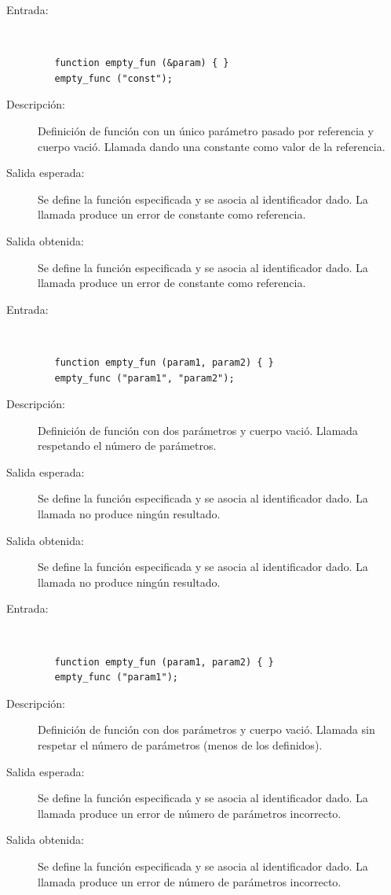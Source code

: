 \begin{framed}
	\begin{description}
		\item [Entrada:] \hfill \\
\begin{lstlisting}
   function empty_fun (&param) { } 
   empty_func ("const");
\end{lstlisting}
		\item [Descripción:] Definición de función con un único parámetro pasado por referencia y cuerpo vació. Llamada dando una constante como valor de la referencia.
		\item [Salida esperada:] Se define la función especificada y se asocia al identificador dado. La llamada produce un error de constante como referencia.
		\item [Salida obtenida:] Se define la función especificada y se asocia al identificador dado. La llamada produce un error de constante como referencia.
	\end{description}
\end{framed}

\begin{framed}
	\begin{description}
		\item [Entrada:] \hfill \\
\begin{lstlisting}
   function empty_fun (param1, param2) { } 
   empty_func ("param1", "param2");
\end{lstlisting}
		\item [Descripción:] Definición de función con dos parámetros y cuerpo vació. Llamada respetando el número de parámetros.
		\item [Salida esperada:] Se define la función especificada y se asocia al identificador dado. La llamada no produce ningún resultado.
		\item [Salida obtenida:] Se define la función especificada y se asocia al identificador dado. La llamada no produce ningún resultado.
	\end{description}
\end{framed}

\begin{framed}
	\begin{description}
		\item [Entrada:] \hfill \\
\begin{lstlisting}
   function empty_fun (param1, param2) { } 
   empty_func ("param1");
\end{lstlisting}
		\item [Descripción:] Definición de función con dos parámetros y cuerpo vació. Llamada sin respetar el número de parámetros (menos de los definidos). 
		\item [Salida esperada:] Se define la función especificada y se asocia al identificador dado. La llamada produce un error de número de parámetros incorrecto. 
		\item [Salida obtenida:] Se define la función especificada y se asocia al identificador dado. La llamada produce un error de número de parámetros incorrecto.
	\end{description}
\end{framed}


